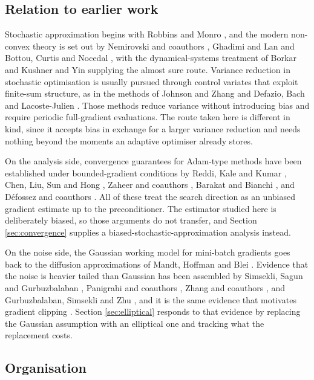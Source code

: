 \documentclass[pdflatex,sn-mathphys-num]{sn-jnl}%
\theoremstyle{thmstyleone}%
\theoremstyle{thmstyletwo}%
\theoremstyle{thmstylethree}%
\begin{document}
\subsection{Relation to earlier work}

Stochastic approximation begins with Robbins and Monro \cite{robbins1951}, and the modern non-convex theory is set out by Nemirovski and coauthors \cite{nemirovski2009}, Ghadimi and Lan \cite{ghadimi2013} and Bottou, Curtis and Nocedal \cite{bottou2018}, with the dynamical-systems treatment of Borkar \cite{borkar2008} and Kushner and Yin \cite{kushner2003} supplying the almost sure route. Variance reduction in stochastic optimisation is usually pursued through control variates that exploit finite-sum structure, as in the methods of Johnson and Zhang \cite{johnson2013} and Defazio, Bach and Lacoste-Julien \cite{defazio2014}. Those methods reduce variance without introducing bias and require periodic full-gradient evaluations. The route taken here is different in kind, since it accepts bias in exchange for a larger variance reduction and needs nothing beyond the moments an adaptive optimiser already stores.

On the analysis side, convergence guarantees for Adam-type methods have been established under bounded-gradient conditions by Reddi, Kale and Kumar \cite{reddi2018}, Chen, Liu, Sun and Hong \cite{chen2019}, Zaheer and coauthors \cite{zaheer2018}, Barakat and Bianchi \cite{barakat2021}, and D\'efossez and coauthors \cite{defossez2022}. All of these treat the search direction as an unbiased gradient estimate up to the preconditioner. The estimator studied here is deliberately biased, so those arguments do not transfer, and Section \ref{sec:convergence} supplies a biased-stochastic-approximation analysis instead.

On the noise side, the Gaussian working model for mini-batch gradients goes back to the diffusion approximations of Mandt, Hoffman and Blei \cite{mandt2017}. Evidence that the noise is heavier tailed than Gaussian has been assembled by Simsekli, Sagun and Gurbuzbalaban \cite{simsekli2019}, Panigrahi and coauthors \cite{panigrahi2019}, Zhang and coauthors \cite{zhang2020attention}, and Gurbuzbalaban, Simsekli and Zhu \cite{gurbuzbalaban2021}, and it is the same evidence that motivates gradient clipping \cite{zhang2020clipping}. Section \ref{sec:elliptical} responds to that evidence by replacing the Gaussian assumption with an elliptical one and tracking what the replacement costs.

\subsection{Organisation}
\end{document}
